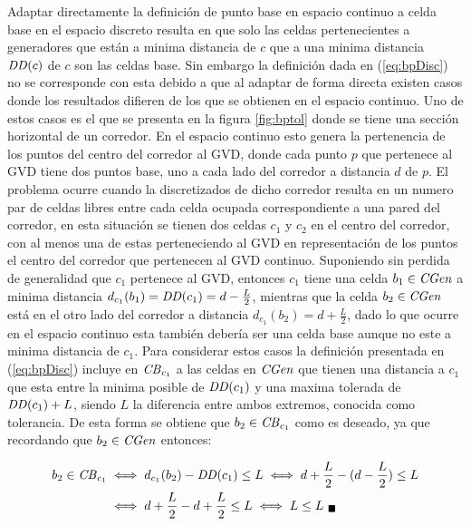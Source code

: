 Adaptar directamente la definición de punto base en espacio continuo a celda
base en el espacio discreto resulta en que solo las celdas pertenecientes a
generadores que están a minima distancia de $c$ que a una minima distancia
$\mathit{DD}(c)$ de $c$ son las celdas base. Sin embargo la definición dada en
(\ref{eq:bpDisc}) no se corresponde con esta debido a que al adaptar de forma
directa existen casos donde los resultados difieren de los que se obtienen en
el espacio continuo. 
Uno de estos casos es el que se presenta en la figura \ref{fig:bptol} donde se
tiene una sección horizontal de un corredor. En el espacio continuo esto genera
la pertenencia de los puntos del centro del corredor al GVD, donde cada punto
$p$ que pertenece al GVD tiene dos puntos base, uno a cada lado del corredor a
distancia $d$ de $p$. 
El problema ocurre cuando la discretizados de dicho corredor resulta en un
numero par de celdas libres entre cada celda ocupada correspondiente a una
pared del corredor, en esta situación se tienen dos celdas $c_1$ y $c_2$ en el
centro del corredor, con al menos una de estas perteneciendo al GVD en
representación de los puntos el centro del corredor que pertenecen al GVD continuo.
Suponiendo sin perdida de generalidad que $c_1$ pertenece al GVD, entonces $c_1$
tiene una celda $b_1 \in \mathit{CGen}$ a minima distancia $d_{c_1}(b_1) = \mathit{DD}(c_1) =
d-\frac{L}{2}$, mientras que la celda $b_2 \in \mathit{CGen}$ está en el otro lado del
corredor a distancia $d_{c_1}(b_2) = d+\frac{L}{2}$, dado lo que ocurre en el
espacio continuo esta también debería ser una celda base aunque no este a
minima distancia de $c_1$. Para considerar estos casos la definición presentada
en (\ref{eq:bpDisc}) incluye en $\mathit{CB}_{c_1}$ a las celdas en $\mathit{CGen}$ que
tienen una distancia a $c_1$ que esta entre la minima posible de $\mathit{DD}(c_1)$ y
una maxima tolerada de $\mathit{DD}(c_1)+L$, siendo $L$ la diferencia entre ambos
extremos, conocida como tolerancia. De esta forma se obtiene que $b_2 \in
\mathit{CB}_{c_1}$ como es deseado, ya que recordando que $b_2\in \mathit{CGen}$ entonces:

\begin{align*}
\begin{split}
  b_2 \in \mathit{CB}_{c_1} & \iff  d_{c_1}(b_2) - \mathit{DD}(c_1) \leq L \iff d+\frac{L}{2} - (d-\frac{L}{2}) \leq L\\
                          & \iff   d+\frac{L}{2} -d +\frac{L}{2} \leq L \iff L \leq L_{\ \blacksquare}
\end{split}
\end{align*}

